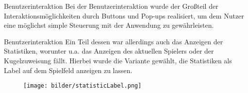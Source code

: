 \begin{frame}{Benutzerinteraktion}
	Bei der Benutzerinteraktion wurde der Großteil der Interaktionsmöglichkeiten durch Buttons und Pop-ups realisiert, um dem Nutzer eine möglichst simple Steuerung mit der Anwendung zu gewährleisten.
	
	\begin{center}
	\end{center}
\end{frame}

\begin{frame}{Benutzerinteraktion}
	Ein Teil dessen war allerdings auch das Anzeigen der Statistiken, worunter u.a. das Anzeigen des aktuellen Spielers oder der Kugelzuweisung fällt. Hierbei wurde die Variante gewählt, die Statistiken als Label auf dem Spielfeld anzeigen zu lassen.
	\begin{figure}[h]
		\texttt{[image: bilder/statisticLabel.png]}
	\end{figure}
\end{frame}
